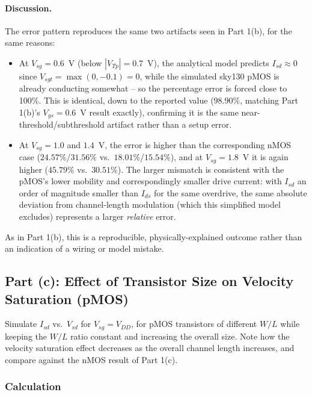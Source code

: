 \paragraph{Discussion.} The error pattern reproduces the same two artifacts seen in Part 1(b), for the same reasons:
\begin{itemize}
  \item At $V_{sg}=0.6$~V (below $|V_{Tp}|=0.7$~V), the analytical model predicts $I_{sd}\approx0$ since $V_{sgt}=\max(0,-0.1)=0$, while the simulated sky130 pMOS is already conducting somewhat -- so the percentage error is forced close to 100\%. This is identical, down to the reported value ($98.90\%$, matching Part 1(b)'s $V_{gs}=0.6$~V result exactly), confirming it is the same near-threshold/subthreshold artifact rather than a setup error.
  \item At $V_{sg}=1.0$ and $1.4$~V, the error is higher than the corresponding nMOS case ($24.57\%$/$31.56\%$ vs.\ $18.01\%$/$15.54\%$), and at $V_{sg}=1.8$~V it is again higher ($45.79\%$ vs.\ $30.51\%$). The larger mismatch is consistent with the pMOS's lower mobility and correspondingly smaller drive current: with $I_{sd}$ an order of magnitude smaller than $I_{ds}$ for the same overdrive, the same absolute deviation from channel-length modulation (which this simplified model excludes) represents a larger \emph{relative} error.
\end{itemize}
As in Part 1(b), this is a reproducible, physically-explained outcome rather than an indication of a wiring or model mistake.

\subsection{Part (c): Effect of Transistor Size on Velocity Saturation (pMOS)}

Simulate $I_{sd}$ vs.\ $V_{sd}$ for $V_{sg} = V_{DD}$, for pMOS transistors of different $W/L$ while keeping the $W/L$ ratio constant and increasing the overall size. Note how the velocity saturation effect decreases as the overall channel length increases, and compare against the nMOS result of Part 1(c).

\subsubsection{Calculation}

